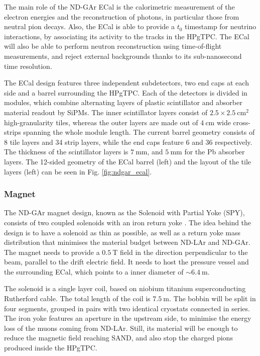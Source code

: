 The main role of the ND-GAr ECal is the calorimetric measurement of the electron energies and the reconstruction of photons, in particular those from neutral pion decays. Also, the ECal is able to provide a $t_{0}$ timestamp for neutrino interactions, by associating its activity to the tracks in the HPgTPC. The ECal will also be able to perform neutron reconstruction using time-of-flight measurements, and reject external backgrounds thanks to its sub-nanosecond time resolution.

The ECal design features three independent subdetectors, two end caps at each side and a barrel surrounding the HPgTPC. Each of the detectors is divided in modules, which combine alternating layers of plastic scintillator and absorber material readout by SiPMs. The inner scintillator layers consist of $2.5\times2.5~\mathrm{cm}^{2}$ high-granularity tiles, whereas the outer layers are made out of $4~\mathrm{cm}$ wide cross-strips spanning the whole module length. The current barrel geometry consists of 8 tile layers and 34 strip layers, while the end caps feature 6 and 36 respectively. The thickness of the scintillator layers is $7~\mathrm{mm}$, and $5~\mathrm{mm}$ for the Pb absorber layers. The 12-sided geometry of the ECal barrel (left) and the layout of the tile layers (left) can be seen in Fig. \ref{fig:ndgar_ecal}.

\subsubsection{Magnet}

The ND-GAr magnet design, known as the Solenoid with Partial Yoke (SPY), consists of two coupled solenoids with an iron return yoke \cite{DUNESPY2023}. The idea behind the design is to have a solenoid as thin as possible, as well as a return yoke mass distribution that minimises the material budget between ND-LAr and ND-GAr. The magnet needs to provide a $0.5~\mathrm{T}$ field in the direction perpendicular to the beam, parallel to the drift electric field. It needs to host the pressure vessel and the surrounding ECal, which points to a inner diameter of $\sim6.4~\mathrm{m}$.

The solenoid is a single layer coil, based on niobium titanium superconducting Rutherford cable. The total length of the coil is $7.5~\mathrm{m}$. The bobbin will be split in four segments, grouped in pairs with two identical cryostats connected in series. The iron yoke features an aperture in the upstream side, to minimise the energy loss of the muons coming from ND-LAr. Still, its material will be enough to reduce the magnetic field reaching SAND, and also stop the charged pions produced inside the HPgTPC.

